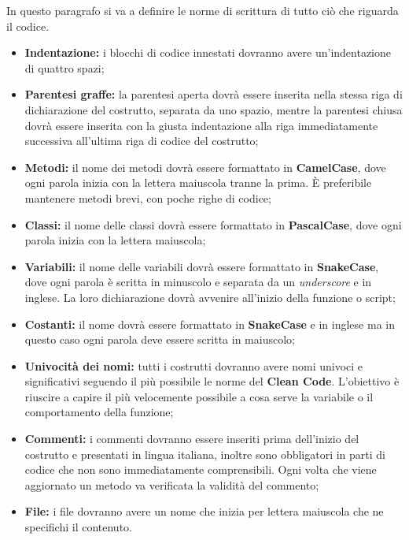 In questo paragrafo si va a definire le norme di scrittura di tutto ciò che riguarda il codice.
\begin{itemize}
    \item \textbf{Indentazione:} i blocchi di codice innestati dovranno avere un’indentazione di quattro spazi;
    \item \textbf{Parentesi graffe:} la parentesi aperta dovrà essere inserita nella stessa riga di dichiarazione del
    costrutto, separata da uno spazio, mentre la parentesi chiusa dovrà essere inserita con la giusta
    indentazione alla riga immediatamente successiva all’ultima riga di codice del costrutto;
    \item \textbf{Metodi:} il nome dei metodi dovrà essere formattato in \textbf{CamelCase}, dove ogni parola inizia con la lettera maiuscola tranne la prima.
    È preferibile mantenere metodi brevi, con poche righe di codice;
    \item \textbf{Classi:} il nome delle classi dovrà essere formattato in \textbf{PascalCase}, dove ogni parola inizia con la lettera maiuscola;
    \item \textbf{Variabili:} il nome delle variabili dovrà essere formattato in \textbf{SnakeCase}, dove ogni parola è scritta in minuscolo e separata da un \textit{underscore} e in inglese.
    La loro dichiarazione dovrà avvenire all’inizio della funzione o script;
    \item \textbf{Costanti:} il nome dovrà essere formattato in \textbf{SnakeCase} e in inglese ma in questo caso ogni parola deve essere scritta in maiuscolo;
    \item \textbf{Univocità dei nomi:} tutti i costrutti dovranno avere nomi univoci e significativi seguendo il più possibile le norme del \textbf{Clean Code}. 
    L'obiettivo è riuscire a capire il più velocemente possibile a cosa serve la variabile o il comportamento della funzione;
    \item \textbf{Commenti:} i commenti dovranno essere inseriti prima dell’inizio del costrutto e presentati in lingua
    italiana, inoltre sono obbligatori in parti di codice che non sono immediatamente comprensibili.
    Ogni volta che viene aggiornato un metodo va verificata la validità del commento;
    \item \textbf{File:} i file dovranno avere un nome che inizia per lettera maiuscola che ne specifichi il contenuto.
\end{itemize}

